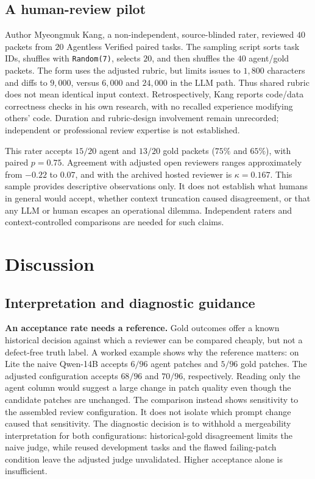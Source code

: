 \documentclass[10pt,conference]{IEEEtran}
\begin{document}
\subsection{A human-review pilot}
Author Myeongmuk Kang, a non-independent, source-blinded rater, reviewed $40$ packets from
$20$ Agentless Verified paired tasks. The sampling script sorts task IDs, shuffles with \texttt{Random(7)}, selects
$20$, and then shuffles the $40$ agent/gold packets. The form uses the adjusted rubric,
but limits issues to $1{,}800$ characters and diffs to $9{,}000$, versus $6{,}000$ and
$24{,}000$ in the LLM path. Thus shared rubric does not mean identical input context.
Retrospectively, Kang reports code/data correctness checks in his own research, with no
recalled experience modifying others' code. Duration and rubric-design involvement remain
unrecorded; independent or professional review expertise is not established.

This rater accepts $15/20$ agent and $13/20$ gold packets ($75\%$ and $65\%$), with
paired $p=0.75$. Agreement with adjusted open reviewers ranges approximately from
$-0.22$ to $0.07$, and with the archived hosted reviewer is $\kappa=0.167$. This sample
provides descriptive observations only. It does not establish what humans in general would
accept, whether context truncation caused disagreement, or that any LLM or human escapes
an operational dilemma. Independent raters and context-controlled comparisons are needed
for such claims.

\section{Discussion}
\label{sec:discussion}
\subsection{Interpretation and diagnostic guidance}
\textbf{An acceptance rate needs a reference.} Gold outcomes offer a known historical
decision against which a reviewer can be compared cheaply, but not a defect-free truth
label. A worked example shows why the reference matters: on Lite the naive Qwen-14B
accepts $6/96$ agent patches and $5/96$ gold patches. The adjusted configuration accepts
$68/96$ and $70/96$, respectively. Reading only the agent column would suggest a large
change in patch quality even though the candidate patches are unchanged. The comparison
instead shows sensitivity to the assembled review configuration. It does not isolate
which prompt change caused that sensitivity. The diagnostic decision is to withhold
a mergeability interpretation for both configurations: historical-gold disagreement
limits the naive judge, while reused development tasks and the flawed failing-patch
condition leave the adjusted judge unvalidated. Higher acceptance alone is insufficient.
\end{document}
